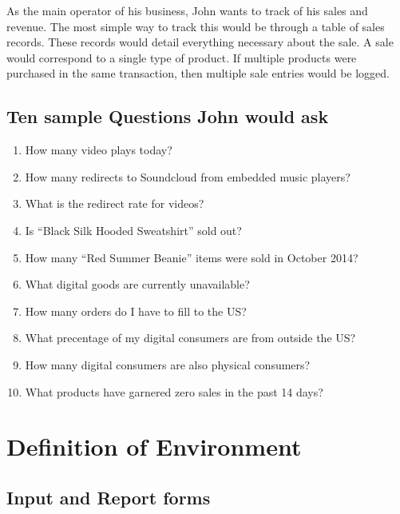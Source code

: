 \documentclass[11pt, a4paper]{report}
\begin{document}
As the main operator of his business, John wants to track of his sales and revenue. The most simple way to track this would be through a table of sales records. These records would detail everything necessary about the sale. A sale would correspond to a single type of product. If multiple products were purchased in the same transaction, then multiple sale entries would be logged.\\

\clearpage
\section{Ten sample Questions John would ask}
\begin{enumerate}
    \item How many video plays today?
    \item How many redirects to Soundcloud from embedded music players?
    \item What is the redirect rate for videos?
    \item Is ``Black Silk Hooded Sweatshirt'' sold out?
    \item How many ``Red Summer Beanie'' items were sold in October 2014?
    \item What digital goods are currently unavailable?
    \item How many orders do I have to fill to the US?
    \item What precentage of my digital consumers are from outside the US?
    \item How many digital consumers are also physical consumers?
    \item What products have garnered zero sales in the past 14 days? 
\end{enumerate}

\chapter{Definition of Environment}

\section{Input and Report forms}
\end{document}
